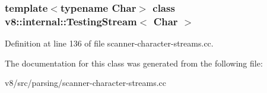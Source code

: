 \subsubsection*{template$<$typename Char$>$\newline
class v8\+::internal\+::\+Testing\+Stream$<$ Char $>$}



Definition at line 136 of file scanner-\/character-\/streams.\+cc.



The documentation for this class was generated from the following file\+:\begin{DoxyCompactItemize}
\item 
v8/src/parsing/scanner-\/character-\/streams.\+cc\end{DoxyCompactItemize}

